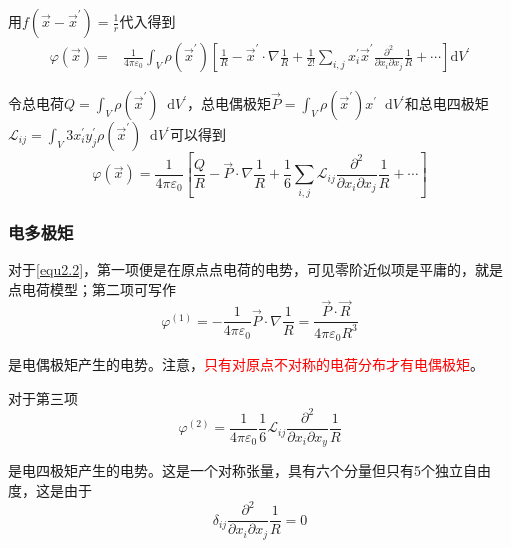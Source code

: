 \documentclass[UTF8]{ctexart}
\newcommand*{\dif}{\mathop{}\!\mathrm{d}}
\newcommand{\red}{\textcolor{red}}
\begin{document}
\noindent 用$f\left(\vec{x}-\vec{x}^{\prime}\right) = \frac{1}{r}$代入得到
\begin{equation}
    \begin{aligned}
        \varphi(\vec{x})=& \frac{1}{4 \pi \varepsilon_{0}} \int_{V} \rho\left(\vec{x}^{\prime}\right)\left[\frac{1}{R}-\vec{x}^{\prime} \cdot \nabla \frac{1}{R}+\frac{1}{2 !} \sum_{i, j} x_i^{\prime} \vec{x}^{\prime} \frac{\partial^{2}}{\partial x_i \partial x_j} \frac{1}{R}+\cdots\right] \mathrm{d} V^{\prime}
        \end{aligned}
\end{equation}

    令总电荷$Q = \int_V \rho(\vec{x}^{\prime}) \dif V^{\prime}$，总电偶极矩$\vec{P} = \int_V \rho(\vec{x}^{\prime}) x^{\prime} \dif V^{\prime}$和总电四极矩$\mathscr{L}_{ij} = \int_V 3 x_i^{\prime} y_j^{\prime} \rho(\vec{x}^{\prime}) \dif V^{\prime}$可以得到
    \begin{equation}
        \varphi(\vec{x})=\frac{1}{4 \pi \varepsilon_{0}}\left[\frac{Q}{R}-\vec{P} \cdot \nabla \frac{1}{R}+\frac{1}{6} \sum_{i, j} \mathscr{L}_{i j} \frac{\partial^{2}}{\partial x_i \partial x_j} \frac{1}{R}+\cdots\right]\label{equ2.2}
    \end{equation}

    \subsubsection{电多极矩}
    对于\autoref{equ2.2}，第一项便是在原点点电荷的电势，可见零阶近似项是平庸的，就是点电荷模型；第二项可写作
    \begin{equation}
        \varphi^{(1)} = - \frac{1}{4 \pi \varepsilon_0} \vec{P} \cdot \nabla \frac{1}{R} = \frac{\vec{P} \cdot \vec{R}}{4 \pi \varepsilon_0 R^3}
    \end{equation}

\noindent 是电偶极矩产生的电势。注意，\red{只有对原点不对称的电荷分布才有电偶极矩}。

    对于第三项
    \begin{equation}
        \varphi^{(2)} = \frac{1}{4 \pi \varepsilon_0} \frac{1}{6} \mathscr{L}_{ij} \frac{\partial^2}{\partial x_i \partial x_y} \frac{1}{R}
    \end{equation}

\noindent 是电四极矩产生的电势。这是一个对称张量，具有六个分量但只有5个独立自由度，这是由于
\begin{equation}
    \delta_{ij} \frac{\partial^2}{\partial x_i \partial x_j} \frac{1}{R} = 0
\end{equation}
\end{document}
